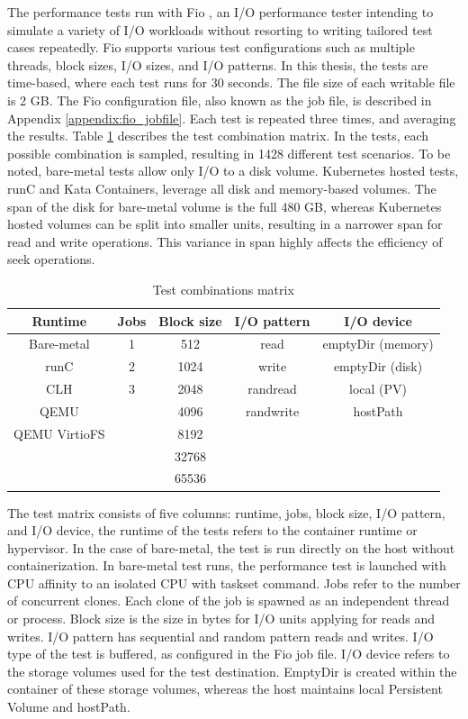 The performance tests run with Fio \cite{FIO}, an I/O performance tester intending to simulate a variety of I/O workloads without resorting to writing tailored test cases repeatedly. Fio supports various test configurations such as multiple threads, block sizes, I/O sizes, and I/O patterns. In this thesis, the tests are time-based, where each test runs for 30 seconds. The file size of each writable file is 2 GB. The Fio configuration file, also known as the job file, is described in Appendix \ref{appendix:fio_jobfile}. Each test is repeated three times, and averaging the results. Table \ref{table:TestMatrix} describes the test combination matrix. In the tests, each possible combination is sampled, resulting in 1428 different test scenarios. To be noted, bare-metal tests allow only I/O to a disk volume. Kubernetes hosted tests, runC and Kata Containers, leverage all disk and memory-based volumes. The span of the disk for bare-metal volume is the full 480 GB, whereas Kubernetes hosted volumes can be split into smaller units, resulting in a narrower span for read and write operations. This variance in span highly affects the efficiency of seek operations.

\begin{table}[ht]
\centering
\caption{Test combinations matrix}
\vspace{\baselineskip}
\begin{tabular}{| c | c | c | c | c |}
\hline
\textbf{Runtime} & \textbf{Jobs} & \textbf{Block size} & \textbf{I/O pattern} & \textbf{I/O device} \\ 
\hline
Bare-metal & 1 & 512 & read & emptyDir (memory) \\
\hline
runC & 2 & 1024 & write & emptyDir (disk) \\ 
\hline
CLH & 3 & 2048 & randread & local (PV) \\
\hline
QEMU & & 4096 & randwrite & hostPath \\
\hline
QEMU VirtioFS & & 8192 & & \\
\hline
& & 32768 & & \\
\hline
& & 65536 & & \\
\hline
\end{tabular}
\label{table:TestMatrix}
\end{table}

The test matrix consists of five columns: runtime, jobs, block size, I/O pattern, and I/O device, the runtime of the tests refers to the container runtime or hypervisor. In the case of bare-metal, the test is run directly on the host without containerization. In bare-metal test runs, the performance test is launched with CPU affinity to an isolated CPU with taskset \cite{taskset} command. Jobs refer to the number of concurrent clones. Each clone of the job is spawned as an independent thread or process. Block size is the size in bytes for I/O units applying for reads and writes. I/O pattern has sequential and random pattern reads and writes. I/O type of the test is buffered, as configured in the Fio job file. I/O device refers to the storage volumes used for the test destination. EmptyDir is created within the container of these storage volumes, whereas the host maintains local Persistent Volume and hostPath.

